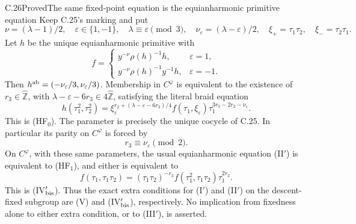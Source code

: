 \begin{statement}{C.26}{Proved}{The same fixed-point equation is the equianharmonic primitive equation}
Keep C.25's marking and put
\[
 \nu=(\lambda-1)/2,\quad
 \varepsilon\in\{1,-1\},\quad\lambda\equiv\varepsilon\pmod3,
 \quad \nu_\varepsilon=(\lambda-\varepsilon)/2,
 \quad\xi_+=\tau_1\tau_2,\quad\xi_-=\tau_2\tau_1.
\]
Let $h$ be the unique equianharmonic primitive with
\[
 f=
 \begin{cases}
 y^{-\nu}\rho(h)^{-1}h,&\varepsilon=1,\\
 y^{-\nu}\rho(h)^{-1}y^{-1}h,&\varepsilon=-1.
 \end{cases}
 \tag{C.26.1}
\]
Then $h^{\rm ab}=(-\nu_\varepsilon/3,\nu_\varepsilon/3)$.
Membership in $C^\varphi$ is equivalent to the existence
of $r_3\in\widehat{\mathbb Z}$, with
$\lambda-\varepsilon-6r_3\in4\widehat{\mathbb Z}$,
satisfying the literal braid equation
\[
 h(\tau_1^2,\tau_2^2)
 =\xi_\varepsilon^{r_2+(\lambda-\varepsilon-6r_3)/4}
       f(\tau_1,\xi_\varepsilon)
       \tau_1^{3r_3-2r_2-\nu_\varepsilon}.
 \tag{C.26.2}
\]
This is (HF$_0$). The parameter is precisely the
unique cocycle of C.25. In particular its parity on
$C^\varphi$ is forced by
\[
                      r_3\equiv\nu_\varepsilon\pmod2.
 \tag{C.26.3}
\]
On $C^\varphi$, with these same parameters, the
usual equianharmonic equation (II$'$) is equivalent
to (HF$_1$), and either is equivalent to
\[
 f(\tau_1,\tau_1\tau_2)
 = (\tau_1\tau_2)^{-r_2}
         f(\tau_1^2,\tau_1\tau_2)\tau_1^{2r_2}.
 \tag{C.26.4}
\]
This is (IV$'_{\rm bis}$). Thus the exact extra
conditions for (I$'$) and (II$'$) on the descent-fixed
subgroup are (V) and (IV$'_{\rm bis}$), respectively.
No implication from fixedness alone to either extra
condition, or to (III$'$), is asserted.
\end{statement}
